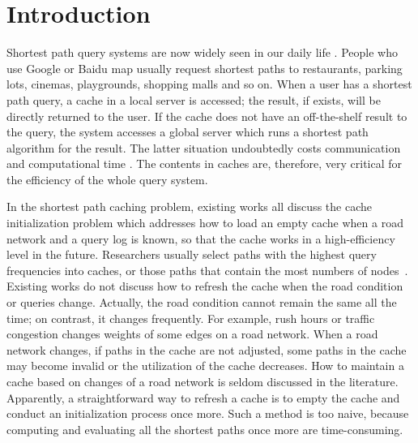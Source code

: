 \section{Introduction}
Shortest path query systems are now widely seen in our daily life \citep{wu2012shortest,potamias2009fast,wei2010tedi,liu2011generalization,
cheng2012efficient}.
People who use Google or Baidu map usually request shortest paths to restaurants, parking lots, cinemas, playgrounds, shopping malls and so on.
When a user has a shortest path query, a cache in a local server is accessed; the result, if exists, will be directly returned to the user. If the cache does not have an off-the-shelf result to the query, the system accesses a global server which runs a shortest path algorithm for the result. The latter situation undoubtedly costs communication and computational time \citep{altingovde2009cost,baeza2007impact,Kriegel2008Hierarchical,gan2009improved,markatos2001caching}. The contents in caches are, therefore, very critical for the efficiency of the whole query system.

In the shortest path caching problem, existing works all discuss the cache initialization problem which addresses how to load an empty cache when a road network and a query log is known, so that the cache works in a high-efficiency level in the future. Researchers usually select paths with the highest query frequencies into caches, or those paths that contain the most numbers of nodes~\citep{thomsen2012effective,li2013}.
Existing works do not discuss how to refresh the cache when the road condition or queries change.
Actually, the road condition cannot remain the same all the time; on contrast, it changes frequently.
For example, rush hours or traffic congestion changes weights of some edges on a road network.
When a road network changes, if paths in the cache are not adjusted, some paths in the cache may become invalid or the utilization of the cache decreases.
How to maintain a cache based on changes of a road network is seldom discussed in the literature.
Apparently, a straightforward way to refresh a cache is to empty the cache and conduct an initialization process once more. Such a method is too naive, because computing and evaluating all the shortest paths once more are time-consuming.

